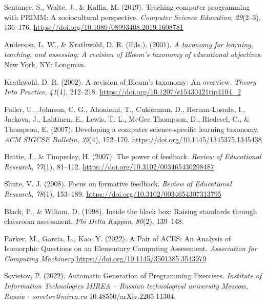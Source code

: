 \documentclass[11pt,a4paper]{article}
\begin{document}
\begin{thebibliography}{99}
Sentance, S., Waite, J., \& Kallia, M. (2019).
Teaching computer programming with PRIMM: A sociocultural perspective.
\textit{Computer Science Education}, \textit{29}(2--3), 136--176.
\url{https://doi.org/10.1080/08993408.2019.1608781}

Anderson, L. W., \& Krathwohl, D. R. (Eds.). (2001).
\textit{A taxonomy for learning, teaching, and assessing: A revision of Bloom's taxonomy of educational objectives}.
New York, NY: Longman.

 Krathwohl, D. R. (2002). A revision of Bloom's taxonomy: An overview. \textit{Theory Into Practice}, \textit{41}(4), 212--218. \url{https://doi.org/10.1207/s15430421tip4104_2}

Fuller, U., Johnson, C. G., Ahoniemi, T., Cukierman, D., Hernan-Losada, I., Jackova, J., Lahtinen, E., Lewis, T. L., McGee Thompson, D., Riedesel, C., \& Thompson, E. (2007).
Developing a computer science-specific learning taxonomy.
\textit{ACM SIGCSE Bulletin}, \textit{39}(4), 152--170.
\url{https://doi.org/10.1145/1345375.1345438}

Hattie, J., \& Timperley, H. (2007).
The power of feedback.
\textit{Review of Educational Research}, \textit{77}(1), 81--112. \url{https://doi.org/10.3102/003465430298487}

Shute, V. J. (2008).
Focus on formative feedback.
\textit{Review of Educational Research}, \textit{78}(1), 153--189. \url{https://doi.org/10.3102/0034654307313795}

Black, P., \& Wiliam, D. (1998).
Inside the black box: Raising standards through classroom assessment.
\textit{Phi Delta Kappan}, \textit{80}(2), 139--148.

 Parker, M., Garcia, L., Kao, Y. (2022). A Pair of ACES: An Analysis of Isomorphic Questions on an Elementary Computing Assessment.
\textit{Association for Computing Machinery} 
\url{https://doi.org/10.1145/3501385.3543979}

Sovietov, P. (2022). Automatic Generation of Programming Exercises. \textit{Institute of Information Technologies MIREA – Russian technological university Moscow, Russia - sovetov@mirea.ru} 10.48550/arXiv.2205.11304. 


\end{thebibliography}
\end{document}
